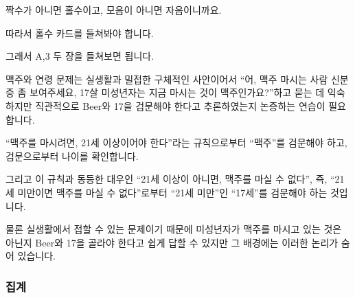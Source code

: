 \documentclass[
]{article}
\begin{document}
짝수가 아니면 홀수이고, 모음이 아니면 자음이니까요.

따라서 홀수 카드를 들쳐봐야 합니다.

그래서 A,3 두 장을 들쳐보면 됩니다.

맥주와 연령 문제는 실생활과 밀접한 구체적인 사안이어서 ``어, 맥주 마시는
사람 신분증 좀 보여주세요, 17살 미성년자는 지금 마시는 것이
맥주인가요?''하고 묻는 데 익숙하지만 직관적으로 Beer와 17을 검문해야
한다고 추론하였는지 논증하는 연습이 필요합니다.

``맥주를 마시려면, 21세 이상이어야 한다''라는 규칙으로부터 ``맥주''를
검문해야 하고, 검문으로부터 나이를 확인합니다.

그리고 이 규칙과 동등한 대우인 ``21세 이상이 아니면, 맥주를 마실 수
없다'', 즉, ``21세 미만이면 맥주를 마실 수 없다''로부터 ``21세 미만''인
``17세''를 검문해야 하는 것입니다.

물론 실생활에서 접할 수 있는 문제이기 때문에 미성년자가 맥주를 마시고
있는 것은 아닌지 Beer와 17을 골라야 한다고 쉽게 답할 수 있지만 그
배경에는 이러한 논리가 숨어 있습니다.

\subsubsection{집계}\label{uxc9d1uxacc4}
\end{document}
